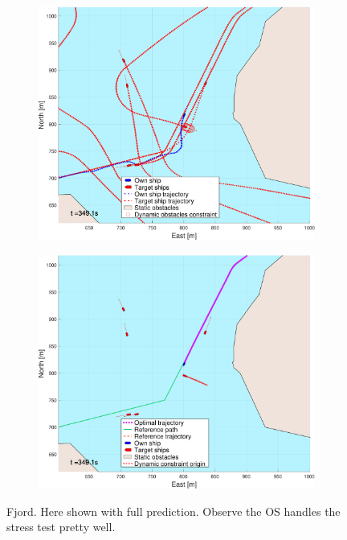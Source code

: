 \begin{figure}[ht!]
\begin{subfigure}[b]{0.494\textwidth}
        \subcaption{}
    \end{subfigure}
    \hfill
    \\ 
    \begin{subfigure}[b]{0.494\textwidth}
        \centering
        \includegraphics[width=\textwidth]{Images/NewFigures/Trheimfjord/_Simple_0fig1_time=350}
        \subcaption{}
    \end{subfigure}
    \hfill
    \begin{subfigure}[b]{0.494\textwidth}
        \centering
        \includegraphics[width=\textwidth]{Images/NewFigures/Trheimfjord/_Simple_0fig999_time=350}
        \subcaption{}
    \end{subfigure}
    \hfill
    \caption{Fjord. Here shown with full prediction. Observe the \gls{OS} handles the stress test pretty well.}

\end{figure}


